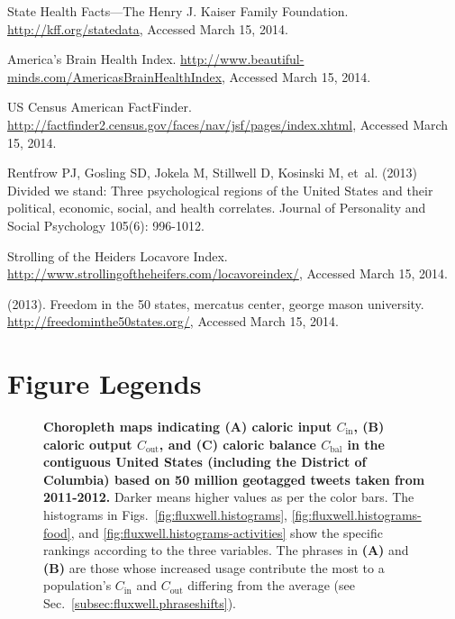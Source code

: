 \documentclass[10pt]{article}
\newcommand{\calin}{C_{\textrm{in}}}
\newcommand{\calout}{C_{\textrm{out}}}
\newcommand{\calbal}{C_{\textrm{bal}}}
\begin{document}
\begin{thebibliography}{10}
State {H}ealth {F}acts---{T}he {H}enry {J}. {K}aiser {F}amily {F}oundation.
\newblock \url{http://kff.org/statedata}, Accessed March 15, 2014.

America's {B}rain {H}ealth {I}ndex.
\newblock \url{http://www.beautiful-minds.com/AmericasBrainHealthIndex},
  Accessed March 15, 2014.

U{S} {C}ensus {A}merican {F}act{F}inder.
\newblock \url{http://factfinder2.census.gov/faces/nav/jsf/pages/index.xhtml},
  Accessed March 15, 2014.

Rentfrow PJ, Gosling SD, Jokela M, Stillwell D, Kosinski M, et~al. (2013)
  Divided we stand: {T}hree psychological regions of the {U}nited {S}tates and
  their political, economic, social, and health correlates.
\newblock Journal of Personality and Social Psychology 105(6): 996-1012.

Strolling of the {H}eiders {L}ocavore {I}ndex.
\newblock \url{http://www.strollingoftheheifers.com/locavoreindex/}, Accessed
  March 15, 2014.

 (2013).
\newblock Freedom in the 50 states, mercatus center, george mason university.
\newblock \url{http://freedominthe50states.org/}, Accessed March 15, 2014.

\end{thebibliography}

\clearpage

\section*{Figure Legends}

\clearpage

\begin{figure*}[tp!]
    \begin{center}
    \end{center}
    \caption{\textbf{
      Choropleth maps indicating 
      \textbf{(A)} caloric input $\calin$,
      \textbf{(B)} caloric output $\calout$,
      and
      \textbf{(C)} caloric balance $\calbal$
      in the contiguous United States (including the District of 
      Columbia) based on 50 million geotagged 
      tweets taken from 2011-2012.
}       Darker means higher values as per the color bars.
      The histograms in Figs.~\ref{fig:fluxwell.histograms},
      \ref{fig:fluxwell.histograms-food},
      and \ref{fig:fluxwell.histograms-activities} 
      show the specific rankings according to the three variables.
      The phrases in \textbf{(A)} and \textbf{(B)}
      are those whose increased usage contribute the most 
      to a population's $\calin$ and $\calout$ differing from the average
      (see Sec.~\ref{subsec:fluxwell.phraseshifts}).
    }
    \label{fig:fluxwell.maps}
\end{figure*}
\end{document}
